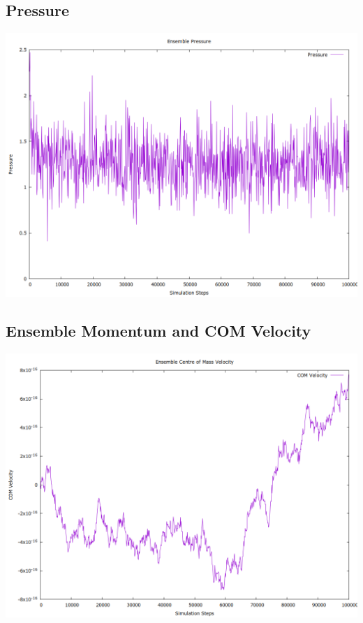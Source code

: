 \documentclass[a4paper,11pt,twoside]{article}
\begin{document}
\subsection{Pressure}
\label{sec:org32ceaa4}
\begin{center}
\includegraphics[width=.9\linewidth]{../../runs/nve_lammps_pair_style/plots/pressure.png}
\end{center}
\subsection{Ensemble Momentum and COM Velocity}
\label{sec:orga91f9fb}
\begin{center}
\includegraphics[width=.9\linewidth]{../../runs/nve_lammps_pair_style/plots/com_velocity.png}
\end{center}
\end{document}
